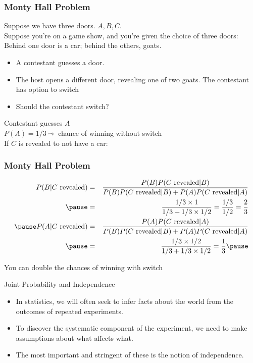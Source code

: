 \documentclass[aspectratio=169]{beamer}
\numberwithin{equation}{section}
\begin{document}
\begin{frame}
\frametitle{Monty Hall Problem}

Suppose we have three doors.  $A, B, C$.  \pause \\
Suppose you're on a game show, and you're given the choice of three doors: Behind one door is a car; behind the others, goats. \\ \pause 
\begin{itemize}
\item[-] A contestant guesses a door. \pause 
\item[-] The host opens a different door, revealing one of two goats. The contestant has option to switch \pause 
\item[-] Should the contestant switch? \pause 
\end{itemize}

Contestant guesses $A$\\ \pause 
$P(A) = 1/3 \leadsto$ chance of winning without switch\\ \pause 
If $C$ is revealed to not have a car:\\

\end{frame}


\begin{frame}
\frametitle{Monty Hall Problem}

\pause 
\begin{eqnarray}
P(B| C \text{ revealed} ) & = & \frac{P(B)P(C \text{ revealed} | B)}{P(B)P(C \text{ revealed} | B) + P(A) P(C \text{ revealed} | A) } \nonumber \\ \pause 
& = & \frac{1/3 \times 1}{1/3 + 1/3 \times 1/2 } = \frac{1/3}{1/2} = \frac{2}{3}\nonumber \\ \pause 
P(A| C \text{ revealed} ) & = & \frac{P(A) P(C \text{ revealed} | A)}{ P(B)P(C \text{ revealed} | B) + P(A) P(C \text{ revealed} | A) }\nonumber \\ \pause 
& = & \frac{1/3 \times 1/2}{1/3 + 1/3 \times 1/2} = \frac{1}{3} \nonumber \pause 
\end{eqnarray}

\alert{You can double the chances of winning with switch}


\end{frame}



\begin{frame}{Joint Probability and Independence}

\begin{itemize}
\item In statistics, we will often seek to infer facts about the world from the outcomes of repeated experiments.\pause
\item To discover the systematic component of the experiment, we need to make assumptions about what affects what.\pause
\item The most important and stringent of these is the notion of independence.
\end{itemize}
\end{frame}
\end{document}
